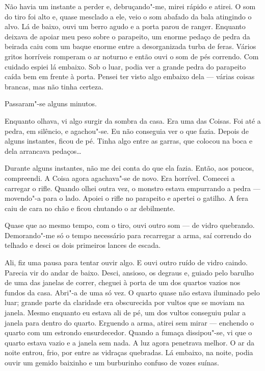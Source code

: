 Não havia um instante a perder e, debruçando"-me, mirei rápido e atirei. O som do tiro foi alto e, quase mesclado a
ele, veio o som abafado da bala atingindo o alvo. Lá de baixo, ouvi um berro agudo e a porta parou de ranger.
Enquanto deixava de apoiar meu peso sobre o parapeito, um enorme pedaço de pedra da beirada caiu com um baque enorme
entre a desorganizada turba de feras. Vários gritos horríveis romperam o ar noturno e então ouvi o som de
pés correndo. Com cuidado espiei lá embaixo. Sob o luar, podia ver a grande pedra do parapeito caída bem em frente
à porta. Pensei ter visto algo embaixo dela --- várias coisas brancas, mas não tinha certeza.

Passaram"-se alguns minutos.

Enquanto olhava, vi algo surgir da sombra da casa. Era uma das Coisas. Foi até a pedra, em silêncio, e agachou"-se.
Eu não conseguia ver o que fazia. Depois de alguns instantes, ficou de pé. Tinha algo entre as garras, que colocou na
boca e dela arrancava pedaços\ldots{}

Durante alguns instantes, não me dei conta do que ela fazia. Então, aos poucos, compreendi. A Coisa agora agachava"-se
de novo. Era horrível. Comecei a carregar o rifle. Quando olhei outra vez, o monstro estava empurrando a
pedra --- movendo"-a para o lado. Apoiei o rifle no parapeito e apertei o gatilho. A fera caiu de cara no chão e ficou
chutando o ar debilmente. 

Quase que ao mesmo tempo, com o tiro, ouvi outro som --- de vidro quebrando. Demorando"-me só o tempo necessário
para recarregar a arma, saí correndo do telhado e desci os dois primeiros lances de escada.

Ali, fiz uma pausa para tentar ouvir algo. E ouvi outro ruído de vidro caindo. Parecia vir do andar de baixo. Desci,
ansioso, os degraus e, guiado pelo barulho de uma das janelas de correr, cheguei à porta de um dos quartos vazios
nos fundos da casa. Abri"-a de uma só vez. O quarto quase não estava iluminado pelo luar; grande parte da claridade era
obscurecida por vultos que se moviam na janela. Mesmo enquanto eu estava ali de pé, um dos vultos conseguiu pular a
janela para dentro do quarto. Erguendo a arma, atirei sem mirar --- enchendo o quarto com um estrondo ensurdecedor.
Quando a fumaça dissipou"-se, vi que o quarto estava vazio e a janela sem nada. A luz agora penetrava melhor. O ar da
noite entrou, frio, por entre as vidraças quebradas. Lá embaixo, na noite, podia ouvir um gemido baixinho e um
burburinho confuso de vozes suínas.

